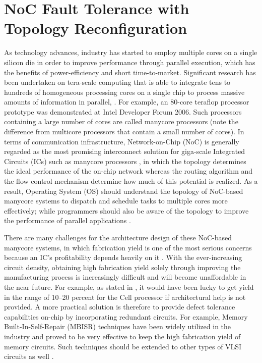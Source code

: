 \section{NoC Fault Tolerance with Topology Reconfiguration}
As technology advances, industry has started to employ multiple cores on a single silicon die in order to improve performance through parallel execution, which has the benefits of power-efficiency and short time-to-market\cite{geer2005chip}. Significant research has been undertaken on tera-scale computing that is able to integrate tens to hundreds of homogeneous processing cores on a single chip to process massive amounts of information in parallel\cite{borkar2007thousand}, \cite{agarwal2007kill}. For example, an 80-core teraflop processor prototype was demonstrated at Intel Developer Forum 2006\cite{computingfew}. Such processors containing a large number of cores are called manycore processors (note the difference from multicore processors that contain a small number of cores). In terms of communication infrastructure, Network-on-Chip (NoC) is generally regarded as the most promising interconnect solution for giga-scale Integrated Circuits (ICs) such as manycore processors \cite{dally2001route,de2008networks}, in which the topology determines the ideal performance of the on-chip network whereas the routing algorithm and the flow control mechanism determine how much of this potential is realized. As a result, Operating System (OS) should understand the topology of NoC-based manycore systems to dispatch and schedule tasks to multiple cores more effectively; while programmers should also be aware of the topology to improve the performance of parallel applications \cite{Microsoft2007numa,stallings2012operating}.

There are many challenges for the architecture design of these NoC-based manycore systems, in which fabrication yield is one of the most serious concerns because an IC’s profitability depends heavily on it \cite{koren1998defect,koren2000should}. With the ever-increasing circuit density, obtaining high fabrication yield solely through improving the manufacturing process is increasingly difficult and will become unaffordable in the near future. For example, as stated in \cite{sperling2007turn}, it would have been lucky to get yield in the range of 10–20 percent for the Cell processor if architectural help is not provided. A more practical solution is therefore to provide defect tolerance capabilities on-chip by incorporating redundant circuits. For example, Memory Built-In-Self-Repair (MBISR) techniques have been widely utilized in the industry and proved to be very effective to keep the high fabrication yield of memory circuits. Such techniques should be extended to other types of VLSI circuits as well \cite{koren1986yield}.

